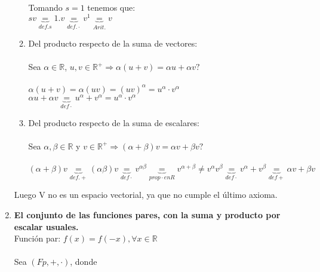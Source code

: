 \documentclass{article}
\begin{document}
\begin{enumerate}[1.]
\begin{enumerate}[(1)]
	Tomando $s = 1$ tenemos que: \\
	$sv \underbrace{=}_{def.s} 1.v \underbrace{=}_{def.\cdot} v^1 \underbrace{=}_{Arit.} v$
\item
	Del producto respecto de la suma de vectores: \\ \\
	Sea $\alpha \in \mathbb{R}$, $u,v \in \mathbb{R}^+ \Rightarrow \alpha(u+v) = \alpha u + \alpha v?$ \\ \\
	$\alpha (u+v) = \alpha ( uv ) = (uv)^\alpha = u^\alpha \cdot v ^ \alpha $ \\
	$\alpha u + \alpha v \underbrace{=}_{def \cdot} u^\alpha + v^\alpha = u^\alpha \cdot v ^\alpha $
\item
	Del producto respecto de la suma de escalares: \\ \\
	Sea $\alpha, \beta \in \mathbb{R}$ y $v \in \mathbb{R}^+ \Rightarrow (\alpha + \beta)v = \alpha v + \beta v?$ \\ \\
	$(\alpha + \beta)v \underbrace{=}_{def.+} (\alpha \beta)v \underbrace{=}_{def \cdot} v^{\alpha \beta} \underbrace{=}_{prop \cdot en R} v^{\alpha + \beta}
	 \not = v^\alpha v^\beta \underbrace{=}_{def \cdot} v^\alpha + v^\beta \underbrace{=}_{def +} \alpha v + \beta v$ \\
\end{enumerate}
Luego V no es un espacio vectorial, ya que no cumple el último axioma.




\item \textbf{El conjunto de las funciones pares, con la suma y producto por escalar usuales.} \\

Función par: $f(x) = f(-x), \forall x \in \mathbb{R}$ \\ \\

Sea $(Fp,+,\cdot)$, donde


\end{enumerate}
\end{document}
